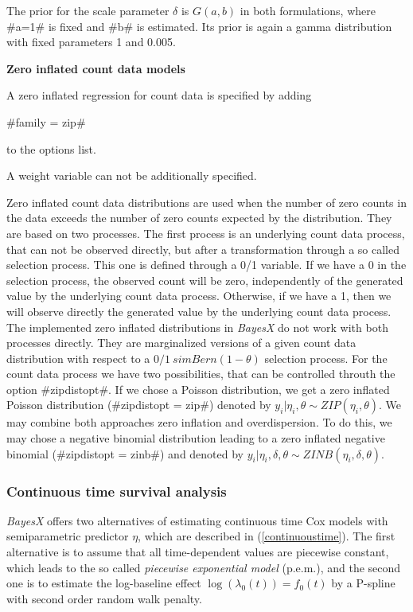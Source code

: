 The prior for the scale parameter $\delta$ is $G(a,b)$ in both
formulations, where #a=1# is fixed and #b# is estimated. Its prior
is again a gamma distribution with fixed parameters 1 and 0.005.

{\bf Zero inflated count data models}

A zero inflated regression for count data is specified by adding

#family = zip#

to the options list.

A weight variable can not be additionally specified.

Zero inflated count data distributions are used when the
number of zero counts in the data exceeds the number of
zero counts expected by the distribution. They are based on 
two processes. The first process is an underlying count data 
process, that can not be observed directly, but after a 
transformation through a so called selection process. This 
one is defined through a 0/1 variable. If we have a 0 in the
selection process, the observed count will be zero, independently
of the generated value by the underlying count data process.
Otherwise, if we have a 1, then we will observe directly the
generated value by the underlying count data process.
The implemented zero inflated distributions in {\em BayesX}
do not work with both processes directly. They are marginalized
versions of a given count data distribution with respect to 
a $0/1 ~sim Bern(1-\theta)$ selection process. For the count
data process we have two possibilities, that can be controlled
throuth the option #zipdistopt#. If we chose a Poisson distribution,
we get a zero inflated Poisson distribution (#zipdistopt = zip#)
denoted by $y_i | \eta_i,\theta \sim ZIP(\eta_i,\theta)$.
We may combine both approaches zero inflation and overdispersion.
To do this, we may chose a negative binomial distribution leading
to a zero inflated negative binomial (#zipdistopt = zinb#) and
denoted by $y_i | \eta_i,\delta, \theta \sim ZINB(\eta_i,\delta,\theta)$.


\subsubsection{Continuous time survival analysis}
\label{cont_survivalAnalysis}

\textit{BayesX} offers two alternatives of estimating continuous
time Cox models with semiparametric predictor $\eta$, which are
described in (\autoref{continuoustime}). The first alternative is
to assume that all time-dependent values are piecewise constant,
which leads to the so called \textit{piecewise exponential model}
(p.e.m.), and the second one is to estimate the log-baseline
effect $\log(\lambda_0(t))=f_0(t)$ by a P-spline with second order
random walk penalty.


